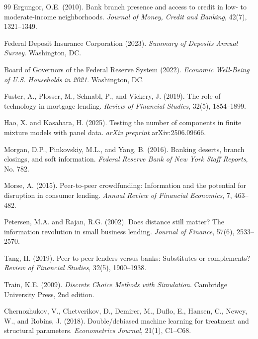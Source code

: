\documentclass[12pt]{article}
\begin{document}
\begin{thebibliography}{99}
Ergungor, O.E. (2010). Bank branch presence and access to credit in low- to moderate-income neighborhoods. \textit{Journal of Money, Credit and Banking}, 42(7), 1321--1349.

Federal Deposit Insurance Corporation (2023). \textit{Summary of Deposits Annual Survey}. Washington, DC.

Board of Governors of the Federal Reserve System (2022). \textit{Economic Well-Being of U.S. Households in 2021}. Washington, DC.

Fuster, A., Plosser, M., Schnabl, P., and Vickery, J. (2019). The role of technology in mortgage lending. \textit{Review of Financial Studies}, 32(5), 1854--1899.

Hao, X. and Kasahara, H. (2025). Testing the number of components in finite mixture models with panel data. \textit{arXiv preprint} arXiv:2506.09666.

Morgan, D.P., Pinkovskiy, M.L., and Yang, B. (2016). Banking deserts, branch closings, and soft information. \textit{Federal Reserve Bank of New York Staff Reports}, No. 782.

Morse, A. (2015). Peer-to-peer crowdfunding: Information and the potential for disruption in consumer lending. \textit{Annual Review of Financial Economics}, 7, 463--482.

Petersen, M.A. and Rajan, R.G. (2002). Does distance still matter? The information revolution in small business lending. \textit{Journal of Finance}, 57(6), 2533--2570.

Tang, H. (2019). Peer-to-peer lenders versus banks: Substitutes or complements? \textit{Review of Financial Studies}, 32(5), 1900--1938.

Train, K.E. (2009). \textit{Discrete Choice Methods with Simulation}. Cambridge University Press, 2nd edition.

Chernozhukov, V., Chetverikov, D., Demirer, M., Duflo, E., Hansen, C., Newey, W., and Robins, J. (2018). Double/debiased machine learning for treatment and structural parameters. \textit{Econometrics Journal}, 21(1), C1--C68.


\end{thebibliography}
\end{document}
